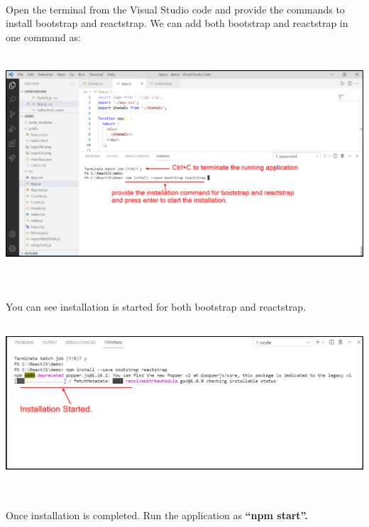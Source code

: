 \documentclass{article}
\begin{document}
\noindent \\
Open the terminal from the Visual Studio code and provide the commands to install bootstrap and reactstrap. We can add both bootstrap and reactstrap in one command as:

\begin{center}
	\noindent \includegraphics*[width=6.15in, height=3.21in]{IMG-09-21}
\end{center}

\noindent 

\noindent \\
You can see installation is started for both bootstrap and reactstrap. 

\begin{center}
	\noindent \includegraphics*[width=6.20in, height=2.32in]{IMG-09-22}
\end{center}

\noindent 

\noindent 

\noindent \\
Once installation is completed. Run the application as \textbf{``npm start''.}

\noindent 
\end{document}

